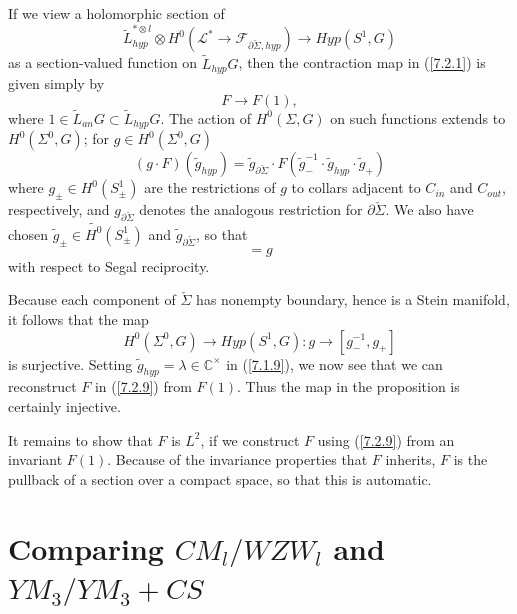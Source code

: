 \documentclass{amsart}
\theoremstyle{conjecture}
\theoremstyle{definition}
\theoremstyle{question}
\theoremstyle{questions}
\theoremstyle{remark}
\theoremstyle{remarks}
\theoremstyle{example}
\numberwithin{equation}{section}
\begin{document}
If we view a holomorphic section of
\begin{equation}\tilde {L}_{hyp}^{*\otimes l}\otimes H^0(\mathcal L^{*}\to \mathcal F_{
\partial\check{\Sigma },hyp})\to Hyp(S^1,G) \label{7.2.7}\end{equation}
as a section-valued function on $\tilde {L}_{hyp}G$, then the
contraction map in (\ref{7.2.1}) is given simply by
\begin{equation}F\to F(1), \label{7.2.8}\end{equation}
where $1\in\tilde {L}_{an}G\subset\tilde {L}_{hyp}G$.  The action of $
H^0(\Sigma ,G)$ on such
functions extends to $H^0(\Sigma^0,G)$; for $g\in H^0(\Sigma^
0,G)$
\begin{equation}\label{7.2.9}(g\cdot F)(\tilde {g}_{hyp})=\tilde {g}_{\partial\check{\Sigma}}
\cdot F(\tilde {g}_{-}^{-1}\cdot\tilde {g}_{hyp}\cdot\tilde {g}_{
+}) \end{equation}
where $g_{\pm}\in H^0(S^1_{\pm})$ are the restrictions of $g$ to collars
adjacent to $C_{in}$ and $C_{out}$, respectively, and $g_{\partial
\check{\Sigma}}$ denotes
the analogous restriction for $\partial\check{\Sigma}$.  We also have chosen
$\tilde {g}_{\pm}\in\tilde {H^0}(S^1_{\pm})$ and $\tilde {g}_{
\partial\check{\Sigma}}$, so that
\begin{equation}[\tilde {g}_{\pm},\tilde {g}_{\partial\check{\Sigma}}]=g \label{7.2.10}\end{equation}
with respect to Segal reciprocity.

Because each component of $\check{\Sigma}$ has nonempty boundary,
hence is a Stein manifold, it follows that the map
\begin{equation}H^0(\Sigma^0,G)\to Hyp(S^1,G):g\to [g^{-1}_{-},g_{+}] \label{7.2.11}\end{equation}
is surjective.  Setting $\tilde {g}_{hyp}=\lambda\in \mathbb C^{\times}$ in (\ref{7.1.9}), we now
see that we can reconstruct $F$ in (\ref{7.2.9}) from $F(1)$.  Thus
the map in the proposition is certainly injective.

It remains to show that $F$ is $L^2$, if we construct $F$
using (\ref{7.2.9}) from an invariant $F(1)$.  Because of the
invariance properties that $F$ inherits, $F$ is the pullback
of a section over a compact space, so that this is
automatic.

\section{Comparing $CM_l/WZW_l$ and $YM_3/YM_3+CS$  }\label{YM}
\end{document}
